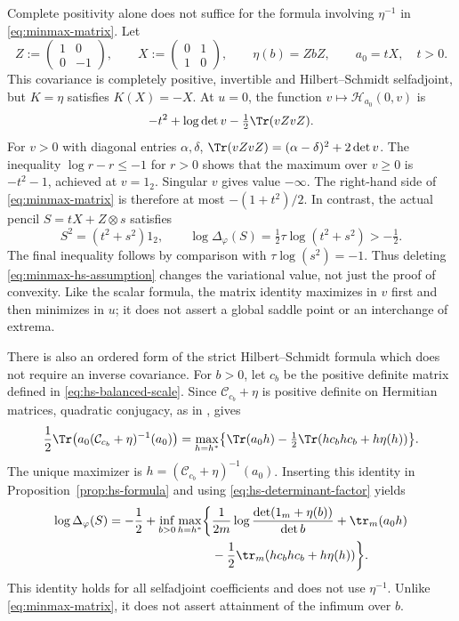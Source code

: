 Complete positivity alone does not suffice for the formula involving $\eta^{-1}$ in \eqref{eq:minmax-matrix}.
Let
\[
 Z:=\begin{pmatrix}1&0\\0&-1\end{pmatrix},\qquad
 X:=\begin{pmatrix}0&1\\1&0\end{pmatrix},\qquad
 \eta(b)=ZbZ,\qquad a_0=tX,\quad t>0.
\]
This covariance is completely positive, invertible and Hilbert--Schmidt selfadjoint, but $K=\eta$ satisfies $K(X)=-X$.
At $u=0$, the function $v\mapsto\mathcal H_{a_0}(0,v)$ is
\[
 -t^2+\log\det v-\tfrac12\Tr(vZvZ).
\]
For $v>0$ with diagonal entries $\alpha,\delta$, $\Tr(vZvZ)=(\alpha-\delta)^2+2\det v$.
The inequality $\log r-r\le-1$ for $r>0$ shows that the maximum over $v\ge0$ is $-t^2-1$, achieved at $v=1_2$.
Singular $v$ gives value $-\infty$.
The right-hand side of \eqref{eq:minmax-matrix} is therefore at most $-(1+t^2)/2$.
In contrast, the actual pencil $S=tX+Z\otimes s$ satisfies
\[
 S^2=(t^2+s^2)1_2,\qquad
 \log\Delta_\varphi(S)=\tfrac12\tau\log(t^2+s^2)>-\tfrac12.
\]
The final inequality follows by comparison with $\tau\log(s^2)=-1$.
Thus deleting \eqref{eq:minmax-hs-assumption} changes the variational value, not just the proof of convexity.
Like the scalar formula, the matrix identity maximizes in $v$ first and then minimizes in $u$; it does not assert a global saddle point or an interchange of extrema.

\begin{remark}\label{prop:minmax-square-completion}
There is also an ordered form of the strict Hilbert--Schmidt formula which does not require an inverse covariance.
For $b>0$, let $c_b$ be the positive definite matrix defined in \eqref{eq:hs-balanced-scale}.
Since $\mathcal C_{c_b}+\eta$ is positive definite on Hermitian matrices, quadratic conjugacy, as in \cite[Example 3.22]{BV04}, gives
\begin{align*}
 \frac12\Tr\bigl(a_0(\mathcal C_{c_b}+\eta)^{-1}(a_0)\bigr)
 =\max_{h=h^*}\bigl\{\Tr(a_0h)
       -\tfrac12\Tr(hc_bhc_b+h\eta(h))\bigr\}.
\end{align*}
The unique maximizer is $h=(\mathcal C_{c_b}+\eta)^{-1}(a_0)$.
Inserting this identity in Proposition~\ref{prop:hs-formula} and using \eqref{eq:hs-determinant-factor} yields
\begin{equation}\label{eq:minmax-hs-square-completion}
\begin{split}
 \log\Delta_\varphi(S)=-\frac12+\inf_{b>0}\max_{h=h^*}
 \biggl\{&\frac1{2m}\log\frac{\det(1_m+\eta(b))}{\det b}
       +\tr_m(a_0h)\\
       &-\frac12\tr_m(hc_bhc_b+h\eta(h))\biggr\}.
\end{split}
\end{equation}
This identity holds for all selfadjoint coefficients and does not use $\eta^{-1}$.
Unlike \eqref{eq:minmax-matrix}, it does not assert attainment of the infimum over $b$.
\end{remark}
